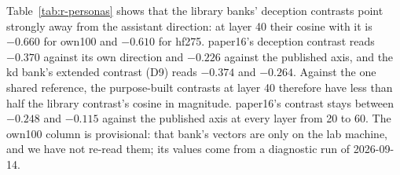 Table~\ref{tab:r-personas} shows that the library banks' deception contrasts point strongly away from the assistant direction: at layer 40 their cosine with it is $-0.660$ for own100 and $-0.610$ for hf275. %
paper16's deception contrast reads $-0.370$ against its own direction and $-0.226$ against the published axis, and the kd bank's extended contrast (D9) reads $-0.374$ and $-0.264$. %
Against the one shared reference, the purpose-built contrasts at layer 40 therefore have less than half the library contrast's cosine in magnitude. %
paper16's contrast stays between $-0.248$ and $-0.115$ against the published axis at every layer from 20 to 60. %
The own100 column is provisional: that bank's vectors are only on the lab machine, and we have not re-read them; its values come from a diagnostic run of 2026-09-14. %

